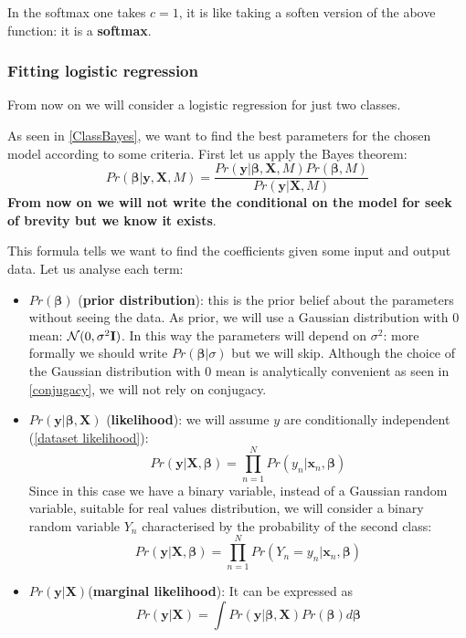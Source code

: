 \documentclass[12pt, letterpaper]{article}
\theoremstyle{definition}
\newcommand{\X}{\mathrm{\mathbf{X}}}
\newcommand{\I}{\mathrm{\mathbf{I}}}
\newcommand{\y}{\mathbf{y}}
\newcommand{\be}{\mathbf{\beta}}
\newcommand{\x}{\mathbf{x}}
\let\tb\textbf
\begin{document}
In the softmax one takes $c=1$, it is like taking a soften version of the above function: it is a \tb{softmax}.

\subsubsection{Fitting logistic regression}
From now on we will consider a logistic regression for just two classes. 

As seen in \autoref{ClassBayes}, we want to find the best parameters for the chosen model according to some criteria. First let us apply the Bayes theorem:
\begin{equation}
Pr\left(\be|\y,\X,M\right) = \frac{Pr\left(\y|\be,\X,M\right) Pr(\be,M)}{Pr(\y|\X,M)}
\end{equation}
\textbf{From now on we will not write the conditional on the model for seek of brevity but we know it exists}.

This formula tells we want to find the coefficients given some input and output data. Let us analyse each term:
\begin{itemize}
\item $Pr(\be)$ (\textbf{prior distribution}): this is the prior belief about the parameters without seeing the data. As prior, we will use a Gaussian distribution with $0$ mean:  $\CMcal{N}(0, \sigma^2\I)$. In this way the parameters will depend on $\sigma^2$: more formally we should write $Pr(\be|\sigma)$ but we will skip. Although the choice of the Gaussian distribution with $0$ mean is analytically convenient as seen in \autoref{conjugacy}, we will not rely on conjugacy.
\item $Pr\left(\y|\be,\X\right)$ (\textbf{likelihood}): we will assume $y$ are conditionally independent (\autoref{dataset likelihood}):
\begin{equation}
Pr(\y|\X, \be) = \prod_{n=1}^N Pr(y_n|\x_n, \be)
\end{equation}
Since in this case we have a binary variable, instead of a Gaussian random variable, suitable for real values distribution, we will consider a binary random variable $Y_n$ characterised by the probability of the second class:
\begin{equation}
Pr(\y|\X, \be) = \prod_{n=1}^N Pr(Y_n=y_n|\x_n, \be)
\end{equation}
\item $Pr(\y|\X)$(\textbf{marginal likelihood}): It can be expressed as 
\begin{equation}
Pr(\y|\X) = \int Pr\left(\y|\be,\X\right) Pr(\be) d\be
\end{equation}
\end{itemize}
\end{document}
